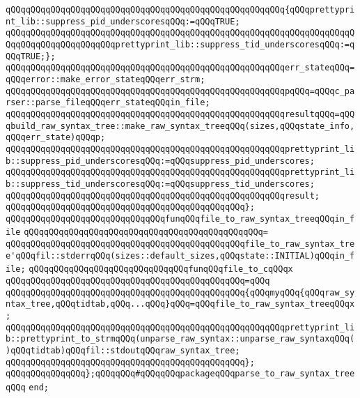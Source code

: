 \verb|qQQqqQQqqQQqqQQqqQQqqQQqqQQqqQQqqQQqqQQqqQQqqQQqqQQqqQQq{qQQqprettyprint_lib::suppress_pid_underscoresqQQq:=qQQqTRUE;|\newline
\verb|qQQqqQQqqQQqqQQqqQQqqQQqqQQqqQQqqQQqqQQqqQQqqQQqqQQqqQQqqQQqqQQqqQQqqQQqqQQqqQQqqQQqqQQqqQQqprettyprint_lib::suppress_tid_underscoresqQQq:=qQQqTRUE;};|\newline
\verb|qQQqqQQqqQQqqQQqqQQqqQQqqQQqqQQqqQQqqQQqqQQqqQQqqQQqqQQqerr_stateqQQq=qQQqerror::make_error_stateqQQqerr_strm;|\newline
\verb|qQQqqQQqqQQqqQQqqQQqqQQqqQQqqQQqqQQqqQQqqQQqqQQqqQQqqQQqpqQQq=qQQqc_parser::parse_fileqQQqerr_stateqQQqin_file;|\newline
\verb|qQQqqQQqqQQqqQQqqQQqqQQqqQQqqQQqqQQqqQQqqQQqqQQqqQQqqQQqresultqQQq=qQQqbuild_raw_syntax_tree::make_raw_syntax_treeqQQq(sizes,qQQqstate_info,qQQqerr_state)qQQqp;|\newline
\newline
\verb|qQQqqQQqqQQqqQQqqQQqqQQqqQQqqQQqqQQqqQQqqQQqqQQqqQQqqQQqprettyprint_lib::suppress_pid_underscoresqQQq:=qQQqsuppress_pid_underscores;|\newline
\verb|qQQqqQQqqQQqqQQqqQQqqQQqqQQqqQQqqQQqqQQqqQQqqQQqqQQqqQQqprettyprint_lib::suppress_tid_underscoresqQQq:=qQQqsuppress_tid_underscores;|\newline
\verb|qQQqqQQqqQQqqQQqqQQqqQQqqQQqqQQqqQQqqQQqqQQqqQQqqQQqqQQqresult;|\newline
\verb|qQQqqQQqqQQqqQQqqQQqqQQqqQQqqQQqqQQqqQQqqQQqqQQq};|\newline
\newline
\verb|qQQqqQQqqQQqqQQqqQQqqQQqqQQqqQQqfunqQQqfile_to_raw_syntax_treeqQQqin_file|\newline
\verb|qQQqqQQqqQQqqQQqqQQqqQQqqQQqqQQqqQQqqQQqqQQqqQQq=|\newline
\verb|qQQqqQQqqQQqqQQqqQQqqQQqqQQqqQQqqQQqqQQqqQQqqQQqfile_to_raw_syntax_tree'qQQqfil::stderrqQQq(sizes::default_sizes,qQQqstate::INITIAL)qQQqin_file;|\newline
\newline
\verb|qQQqqQQqqQQqqQQqqQQqqQQqqQQqqQQqfunqQQqfile_to_cqQQqx|\newline
\verb|qQQqqQQqqQQqqQQqqQQqqQQqqQQqqQQqqQQqqQQqqQQqqQQq=qQQq|\newline
\verb|qQQqqQQqqQQqqQQqqQQqqQQqqQQqqQQqqQQqqQQqqQQqqQQq{qQQqmyqQQq{qQQqraw_syntax_tree,qQQqtidtab,qQQq...qQQq}qQQq=qQQqfile_to_raw_syntax_treeqQQqx;|\newline
\verb|qQQqqQQqqQQqqQQqqQQqqQQqqQQqqQQqqQQqqQQqqQQqqQQqqQQqqQQqprettyprint_lib::prettyprint_to_strmqQQq(unparse_raw_syntax::unparse_raw_syntaxqQQq()qQQqtidtab)qQQqfil::stdoutqQQqraw_syntax_tree;|\newline
\verb|qQQqqQQqqQQqqQQqqQQqqQQqqQQqqQQqqQQqqQQqqQQqqQQq};|\newline
\newline
\verb|qQQqqQQqqQQqqQQq};qQQqqQQq#qQQqqQQqpackageqQQqparse_to_raw_syntax_treeqQQq|\newline
\verb|end;|\newline

